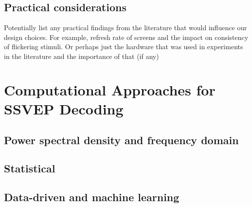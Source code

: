 \subsection{Practical considerations}
Potentially list any practical findings from the literature that would influence our design choices. For example, refresh rate of screens and the impact on consistency of flickering stimuli. Or perhaps just the hardware that was used in experiments in the literature and the importance of that (if any)

\section{Computational Approaches for SSVEP Decoding}
\subsection{Power spectral density and frequency domain}
\subsection{Statistical}
\subsection{Data-driven and machine learning}